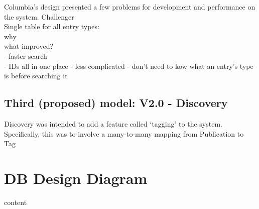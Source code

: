 Columbia's design presented a few problems for development and performance on the system.  
Challenger\\
Single table for all entry types:\\
why\\
what improved?\\
 - faster search\\
 - IDs all in one place - less complicated - don't need to kow what an entry's type is before searching it\\

\subsection{Third (proposed) model: V2.0 - Discovery}
\label{designDiscovery}
Discovery was intended to add a feature called `tagging' to the system.  \\
Specifically, this was to involve a many-to-many mapping from Publication to Tag


\section{DB Design Diagram}
content
